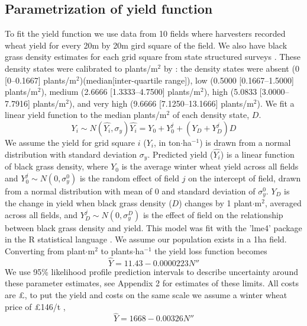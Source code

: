\documentclass[12pt, a4paper]{article}
\begin{document}
\subsection*{Parametrization of yield function} \label{Y_fun}
To fit the yield function we use data from 10 fields where harvesters recorded wheat yield for every 20m by 20m gird square of the field. We also have black grass density estimates for each grid square from state structured surveys \citep{Hick2018}. These density states were calibrated to plants/m$^2$ by \citet{Quee2011}: the density states were absent (0 [0--0.1667] plants/m$^2$)(median[inter-quartile range]), low (0.5000 [0.1667--1.5000] plants/m$^2$), medium (2.6666 [1.3333--4.7500] plants/m$^2$), high (5.0833 [3.0000--7.7916] plants/m$^2$), and very high (9.6666 [7.1250--13.1666] plants/m$^2$). We fit a linear yield function to the median plants/m$^2$ of each density state, $D$. 
\begin{subequations}
\label{eq:est_yield}
\begin{equation}
 Y_i \sim N(\widehat{Y_i}, \sigma_y)
\end{equation}
\begin{equation}
	\widehat{Y_i} = Y_0 + Y_0^j + (Y_D + Y_D^j)D 
\end{equation}
\end{subequations}
We assume the yield for grid square $i$ ($Y_i$, in ton$\cdot$ha$^{-1}$) is drawn from a normal distribution with standard deviation $\sigma_y$. Predicted yield ($\widehat{Y_i}$) is a linear function of black grass density, where $Y_0$ is the average winter wheat yield across all fields and $Y_0^j \sim N(0, \sigma_y^0)$ is the random effect of field $j$ on the intercept of field, drawn from a normal distribution with mean of 0 and standard deviation of $\sigma_y^0$. $Y_D$ is the change in yield when black grass density ($D$) changes by 1 plant$\cdot$m$^2$, averaged across all fields, and $Y_D^j \sim N(0, \sigma_y^D)$ is the effect of field on the relationship between black grass density and yield. This model was fit with the 'lme4' package \citep{Bate2015} in the R statistical language \citep{Rstat}. We assume our population exists in a 1ha field. Converting from plant$\cdot$m$^2$ to plants$\cdot$ha$^{-1}$ the yield loss function becomes 
\begin{equation}
	\widehat{Y} = 11.43 - 0.0000223 N'' 
\end{equation}
We use 95\% likelihood profile prediction intervals to describe uncertainty around these parameter estimates, see Appendix 2 for estimates of these limits. All costs are \pounds, to put the yield and costs on the same scale we assume a winter wheat price of \pounds 146/t \citep{Nix2016}, 
\begin{equation}
	\widehat{Y} = 1668 - 0.00326 N'' 
\end{equation}


 
\end{document}
